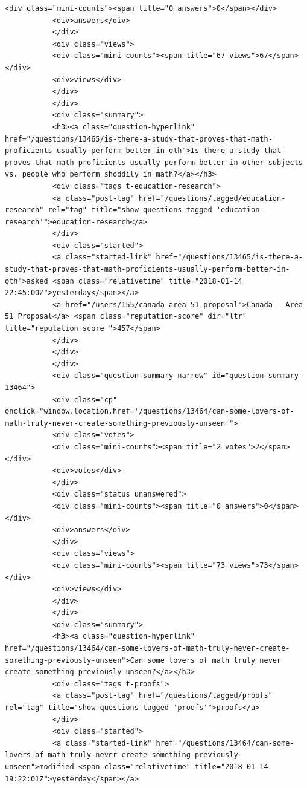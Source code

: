 \documentclass[11pt]{article}
\begin{document}
\begin{Verbatim}[commandchars=\\\{\}]
           <div class="mini-counts"><span title="0 answers">0</span></div>
           <div>answers</div>
           </div>
           <div class="views">
           <div class="mini-counts"><span title="67 views">67</span></div>
           <div>views</div>
           </div>
           </div>
           <div class="summary">
           <h3><a class="question-hyperlink" href="/questions/13465/is-there-a-study-that-proves-that-math-proficients-usually-perform-better-in-oth">Is there a study that proves that math proficients usually perform better in other subjects vs. people who perform shoddily in math?</a></h3>
           <div class="tags t-education-research">
           <a class="post-tag" href="/questions/tagged/education-research" rel="tag" title="show questions tagged 'education-research'">education-research</a>
           </div>
           <div class="started">
           <a class="started-link" href="/questions/13465/is-there-a-study-that-proves-that-math-proficients-usually-perform-better-in-oth">asked <span class="relativetime" title="2018-01-14 22:45:00Z">yesterday</span></a>
           <a href="/users/155/canada-area-51-proposal">Canada - Area 51 Proposal</a> <span class="reputation-score" dir="ltr" title="reputation score ">457</span>
           </div>
           </div>
           </div>
           <div class="question-summary narrow" id="question-summary-13464">
           <div class="cp" onclick="window.location.href='/questions/13464/can-some-lovers-of-math-truly-never-create-something-previously-unseen'">
           <div class="votes">
           <div class="mini-counts"><span title="2 votes">2</span></div>
           <div>votes</div>
           </div>
           <div class="status unanswered">
           <div class="mini-counts"><span title="0 answers">0</span></div>
           <div>answers</div>
           </div>
           <div class="views">
           <div class="mini-counts"><span title="73 views">73</span></div>
           <div>views</div>
           </div>
           </div>
           <div class="summary">
           <h3><a class="question-hyperlink" href="/questions/13464/can-some-lovers-of-math-truly-never-create-something-previously-unseen">Can some lovers of math truly never create something previously unseen?</a></h3>
           <div class="tags t-proofs">
           <a class="post-tag" href="/questions/tagged/proofs" rel="tag" title="show questions tagged 'proofs'">proofs</a>
           </div>
           <div class="started">
           <a class="started-link" href="/questions/13464/can-some-lovers-of-math-truly-never-create-something-previously-unseen">modified <span class="relativetime" title="2018-01-14 19:22:01Z">yesterday</span></a>

\end{Verbatim}
\end{document}
